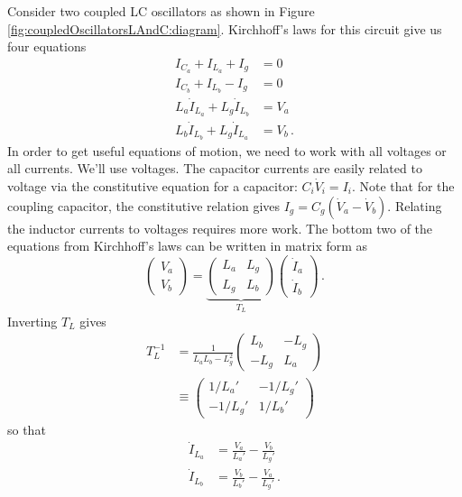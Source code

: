 \documentclass{article}
\begin{document}
Consider two coupled LC oscillators as shown in Figure \ref{fig:coupledOscillatorsLAndC:diagram}.
Kirchhoff's laws for this circuit give us four equations
\begin{align}
  I_{C_a} + I_{L_a} + I_g &= 0 \nonumber \\
  I_{C_b} + I_{L_b} - I_g &= 0 \nonumber \\
  L_a \dot I_{L_a} + L_g \dot I_{L_b} &= V_a \nonumber \\
  L_b \dot I_{L_b} + L_g \dot I_{L_a} &= V_b
  \, .
\end{align}
In order to get useful equations of motion, we need to work with all voltages or all currents.
We'll use voltages.
The capacitor currents are easily related to voltage via the constitutive equation for a capacitor: $C_i \dot V_i = I_i$.
Note that for the coupling capacitor, the constitutive relation gives $I_g = C_g (\dot V_a - \dot V_b)$.
Relating the inductor currents to voltages requires more work.
The bottom two of the equations from Kirchhoff's laws can be written in matrix form as
\begin{equation*}
  \left( \begin{array}{c}
    V_a \\ V_b
  \end{array}\right)
  = \underbrace{ \left( \begin{array}{cc}
    L_a & L_g \\
    L_g & L_b
  \end{array} \right)}_{T_L}
  \left( \begin{array}{c}
    \dot I_a \\ \dot I_b
  \end{array}\right)
  \, .
\end{equation*}
Inverting $T_L$ gives
\begin{align*}
  T_L^{-1}
  &= \frac{1}{L_a L_b - L_g^2} \left( \begin{array}{cc}
    L_b & -L_g \\ -L_g & L_a
  \end{array} \right) \\
  & \equiv \left( \begin{array}{cc}
    1 / L_a' & -1 / L_g' \\ -1 / L_g' & 1 / L_b'
  \end{array} \right)
\end{align*}
so that
\begin{align*}
  \dot I_{L_a} &= \frac{V_a}{L_a'} - \frac{V_b}{L_g'} \\
  \dot I_{L_b} &= \frac{V_b}{L_b'} - \frac{V_a}{L_g'} \, .
\end{align*}
\end{document}
